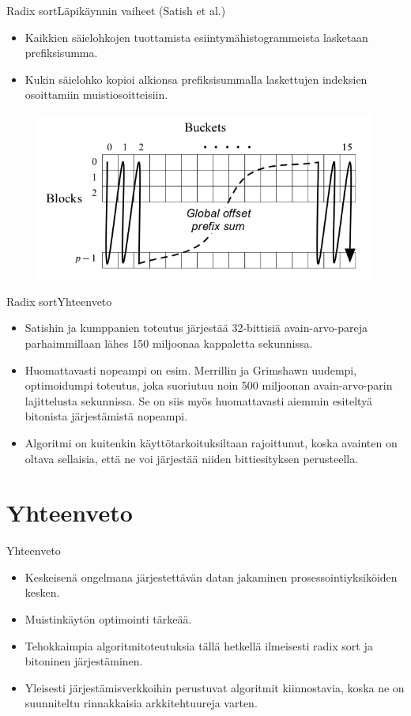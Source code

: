 \documentclass{beamer}
\begin{document}
\begin{frame}{Radix sort}{Läpikäynnin vaiheet (Satish et al.)}
\begin{itemize}
  \item
    Kaikkien säielohkojen tuottamista esiintymähistogrammeista lasketaan prefiksisumma.
  \item
    Kukin säielohko kopioi alkionsa prefiksisummalla laskettujen indeksien osoittamiin muistiosoitteisiin.
\end{itemize}
\begin{figure}
    \includegraphics[scale=0.3]{prefixsum.png}
\end{figure}
\end{frame}

\begin{frame}{Radix sort}{Yhteenveto}
\begin{itemize}
    \item
      Satishin ja kumppanien toteutus järjestää 32-bittisiä avain-arvo-pareja parhaimmillaan lähes 150 miljoonaa kappaletta sekunnissa.
    \item
      Huomattavasti nopeampi on esim. Merrillin ja Grimshawn uudempi, optimoidumpi toteutus, joka suoriutuu noin 500 miljoonan avain-arvo-parin lajittelusta sekunnissa. Se on siis myös huomattavasti aiemmin esiteltyä bitonista järjestämistä nopeampi.
    \item
      Algoritmi on kuitenkin käyttötarkoituksiltaan rajoittunut, koska avainten on oltava sellaisia, että ne voi järjestää niiden bittiesityksen perusteella.
\end{itemize}
\end{frame}

\section{Yhteenveto}

\begin{frame}{Yhteenveto}{}
    \begin{itemize}
        \item Keskeisenä ongelmana järjestettävän datan jakaminen prosessointiyksiköiden kesken.
        \item Muistinkäytön optimointi tärkeää.
        \item Tehokkaimpia algoritmitoteutuksia tällä hetkellä ilmeisesti radix sort ja bitoninen järjestäminen.
        \item Yleisesti järjestämisverkkoihin perustuvat algoritmit kiinnostavia, koska ne on suunniteltu rinnakkaisia arkkitehtuureja varten.
    \end{itemize}
\end{frame}
\end{document}
